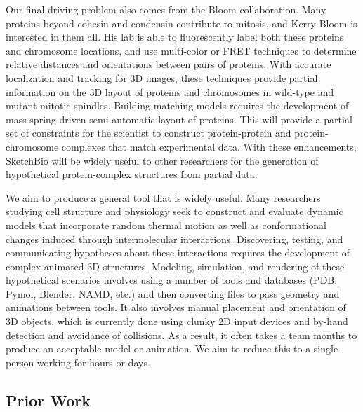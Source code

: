 \documentclass[twocolumn]{bmcart}%
\begin{document}
Our final driving problem also comes from the Bloom collaboration.  Many proteins beyond cohesin and condensin contribute to mitosis, and Kerry Bloom is interested in them all.  His lab is able to fluorescently label both these proteins and chromosome locations, and use multi-color or FRET techniques to determine relative distances and orientations between pairs of proteins.  With accurate localization and tracking for 3D images, these techniques provide partial information on the 3D layout of proteins and chromosomes in wild-type and mutant mitotic spindles.  Building matching models requires the development of mass-spring-driven semi-automatic layout of proteins.  This will provide a partial set of constraints for the scientist to construct protein-protein and protein-chromosome complexes that match experimental data.  With these enhancements, SketchBio will be widely useful to other researchers for the generation of hypothetical protein-complex structures from partial data.

We aim to produce a general tool that is widely useful.  Many researchers studying cell structure and physiology seek to construct
and evaluate dynamic models that incorporate random thermal motion as
well as conformational changes induced through intermolecular interactions.
Discovering, testing, and communicating hypotheses about these
interactions requires the development of complex animated 3D structures. Modeling, simulation, and rendering
of these hypothetical scenarios involves using a number of tools and databases (PDB, Pymol, Blender, NAMD, etc.)
and then converting files to pass geometry and animations between tools. It also involves
manual placement and orientation of 3D objects, which is currently done using clunky 2D input devices and by-hand
detection and avoidance of collisions. As a result, it often takes a team months to produce an acceptable
model or animation. We aim to reduce this to a single person working for hours or days.

\subsection*{Prior Work}
\end{document}
